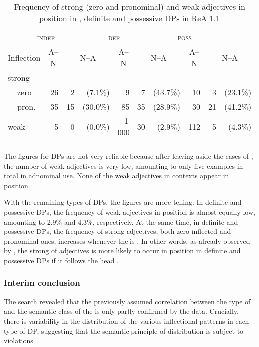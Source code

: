 \documentclass[output=paper,colorlinks,citecolor=brown]{langscibook}
\begin{document}
\begin{table}[t]
\begin{tabular}{ll *3{rr@{~}r}}
\lsptoprule
\multicolumn{2}{l}{} & \multicolumn{3}{c}{\scshape indef}    & \multicolumn{3}{c}{\scshape def}    & \multicolumn{3}{c}{\scshape poss}    \\\cmidrule(lr){3-5}  \cmidrule(lr){6-8}\cmidrule(lr){9-11}
\multicolumn{2}{l}{Inflection}    & \multicolumn{1}{c}{A--N} & \multicolumn{2}{c}{N--A} & \multicolumn{1}{c}{A--N} & \multicolumn{2}{c}{N--A} & \multicolumn{1}{c}{A--N} &  \multicolumn{2}{c}{N--A} \\\midrule
\multicolumn{2}{l}{strong}  & \\
                    & zero  & 26 & 2  &  (7.1\%) &  9 & 7  & (43.7\%) & 10 & 3  & (23.1\%)\\ 
                    & pron. & 35 & 15 & (30.0\%) & 85 & 35 & (28.9\%) & 30 & 21 & (41.2\%)\\
\multicolumn{2}{l}{weak}    & 5 & 0 & (0.0\%) & 1\,000 &  30 & (2.9\%) & 112 & 5 & (4.3\%) \\ 
\lspbottomrule
\end{tabular}
\caption{Frequency of strong (zero and pronominal) and weak adjectives in
 position in , definite and possessive DPs in ReA
1.1}\label{ch6t5}
\end{table}

The figures for  DPs are not very reliable because after
leaving aside the cases of , the number of weak adjectives
is very low, amounting to only five examples in total in adnominal use.
None of the weak adjectives in  contexts appear in
 position.

With the remaining types of DPs, the figures are more telling. In
definite and possessive DPs, the frequency of weak adjectives in
 position is almost equally low, amounting to 2.9\% and
4.3\%, respectively. At the same time, in definite and possessive DPs,
the frequency of strong adjectives, both zero-inflected and pronominal
ones, increases whenever the  is . In other words,
as already observed by \citet{Demske01}, the strong  of adjectives
is more likely to occur in  position in definite and
possessive DPs if it follows the head .


\subsubsection{Interim conclusion}\label{sec:interim conc}\largerpage
The  search revealed that the previously assumed correlation
between the type of  and the semantic class of the
 is only partly confirmed by the data. Crucially, there is
variability in the distribution of the various inflectional patterns in
each type of DP, suggesting that the semantic principle of distribution
is subject to violations.
\end{document}
